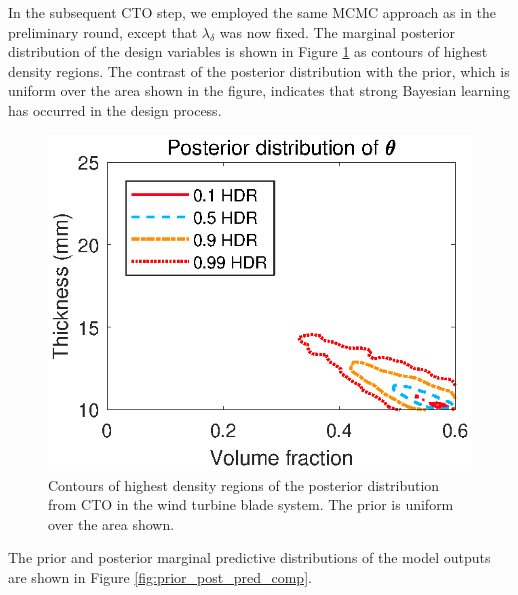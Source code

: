 \documentclass[12pt]{article}
\begin{document}
In the subsequent CTO step, we employed the same MCMC approach as in the preliminary round, except that $\lambda_\delta$ was now fixed.
%
The marginal posterior distribution of the design variables is shown in Figure \ref{fig:wt_marg_post} as contours of highest density regions.
%
The contrast of the posterior distribution with the prior, which is uniform over the area shown in the figure, indicates that strong Bayesian learning has occurred in the design process.
%
\begin{figure}
\centering
\includegraphics[scale=0.8]{FIG_post_dist_contourplot}
\caption{Contours of highest density regions of the posterior distribution from CTO in the wind turbine blade system. The prior is uniform over the area shown.}
\label{fig:wt_marg_post}
\end{figure}
%
The prior and posterior marginal predictive distributions of the model outputs are shown in Figure \ref{fig:prior_post_pred_comp}.
%
\end{document}

